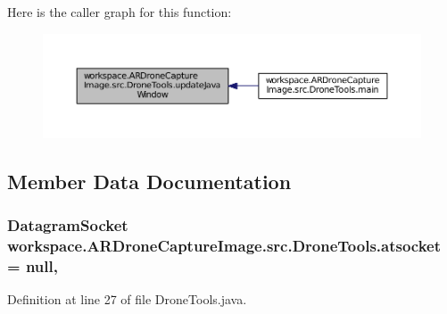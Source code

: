 Here is the caller graph for this function\+:\nopagebreak
\begin{figure}[H]
\begin{center}
\leavevmode
\includegraphics[width=350pt]{classworkspace_1_1_a_r_drone_capture_image_1_1src_1_1_drone_tools_a7bb40703a428b63ed0f23b9a22b72d36_icgraph}
\end{center}
\end{figure}




\subsection{Member Data Documentation}
\hypertarget{classworkspace_1_1_a_r_drone_capture_image_1_1src_1_1_drone_tools_ac0909587a6eff1f1c97c702d25c95e78}{}
\subsubsection[{atsocket}]{\setlength{\rightskip}{0pt plus 5cm}Datagram\+Socket workspace.\+A\+R\+Drone\+Capture\+Image.\+src.\+Drone\+Tools.\+atsocket = null\hspace{0.3cm}{\ttfamily [static]}, {\ttfamily [private]}}\label{classworkspace_1_1_a_r_drone_capture_image_1_1src_1_1_drone_tools_ac0909587a6eff1f1c97c702d25c95e78}


Definition at line 27 of file Drone\+Tools.\+java.

\hypertarget{classworkspace_1_1_a_r_drone_capture_image_1_1src_1_1_drone_tools_a1c1b1c9966fa3b80bb679d60c9b93c4d}{}
